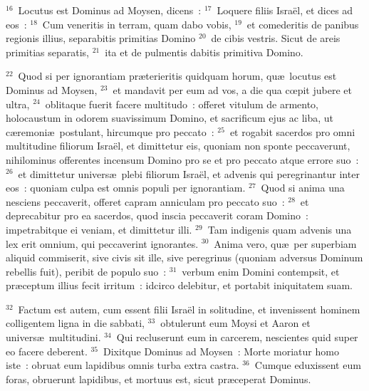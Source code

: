 ${}^{16}$~Locutus est Dominus ad Moysen, dicens~:
${}^{17}$~Loquere filiis Isra\"el, et dices ad eos~:
${}^{18}$~Cum veneritis in terram, quam dabo vobis,
${}^{19}$~et comederitis de panibus regionis illius, separabitis primitias Domino
${}^{20}$~de cibis vestris. Sicut de areis primitias separatis,
${}^{21}$~ita et de pulmentis dabitis primitiva Domino.


${}^{22}$~Quod si per ignorantiam pr\ae terieritis quidquam horum, qu\ae\ locutus est Dominus ad Moysen,
${}^{23}$~et mandavit per eum ad vos, a die qua cœpit jubere et ultra,
${}^{24}$~oblitaque fuerit facere multitudo~: offeret vitulum de armento, holocaustum in odorem suavissimum Domino, et sacrificum ejus ac liba, ut c\ae remoni\ae\ postulant, hircumque pro peccato~:
${}^{25}$~et rogabit sacerdos pro omni multitudine filiorum Isra\"el, et dimittetur eis, quoniam non sponte peccaverunt, nihilominus offerentes incensum Domino pro se et pro peccato atque errore suo~:
${}^{26}$~et dimittetur univers\ae\ plebi filiorum Isra\"el, et advenis qui peregrinantur inter eos~: quoniam culpa est omnis populi per ignorantiam.
${}^{27}$~Quod si anima una nesciens peccaverit, offeret capram anniculam pro peccato suo~:
${}^{28}$~et deprecabitur pro ea sacerdos, quod inscia peccaverit coram Domino~: impetrabitque ei veniam, et dimittetur illi.
${}^{29}$~Tam indigenis quam advenis una lex erit omnium, qui peccaverint ignorantes.
${}^{30}$~Anima vero, qu\ae\ per superbiam aliquid commiserit, sive civis sit ille, sive peregrinus (quoniam adversus Dominum rebellis fuit), peribit de populo suo~:
${}^{31}$~verbum enim Domini contempsit, et pr\ae ceptum illius fecit irritum~: idcirco delebitur, et portabit iniquitatem suam.


${}^{32}$~Factum est autem, cum essent filii Isra\"el in solitudine, et invenissent hominem colligentem ligna in die sabbati,
${}^{33}$~obtulerunt eum Moysi et Aaron et univers\ae\ multitudini.
${}^{34}$~Qui recluserunt eum in carcerem, nescientes quid super eo facere deberent.
${}^{35}$~Dixitque Dominus ad Moysen~: Morte moriatur homo iste~: obruat eum lapidibus omnis turba extra castra.
${}^{36}$~Cumque eduxissent eum foras, obruerunt lapidibus, et mortuus est, sicut pr\ae ceperat Dominus.


